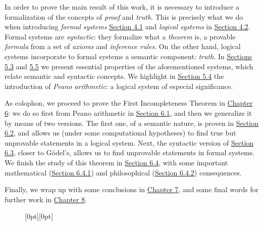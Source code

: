 In order to prove the main result of this work, it is necessary to introduce a formalization of the concepts of \emph{proof} and \emph{truth}. This is precisely what we do when introducing \emph{formal systems} \hyperref[sec:sistemas-formales]{Section 4.1} and \emph{logical systems} in \hyperref[sec:sistemas-logicos]{Section 4.2}. Formal systems are \emph{syntactic}: they formalize what a \emph{theorem} is, a provable \emph{formula} from a set of \emph{axioms} and \emph{inference rules}. On the other hand, logical systems incorporate to formal systems a semantic component: \emph{truth}. In \hyperref[sec:solidez-completitud-decidibilidad]{Sections 5.3} and \hyperref[sec:consistencia]{5.5} we present essential properties of the aforementioned systems, which relate semantic and syntactic concepts. We highlight in \hyperref[sec:aritmetica-peano]{Section 5.4} the introduction of \emph{Peano arithmetic}: a logical system of especial significance.

As colophon, we proceed to prove the First Incompleteness Theorem in \hyperref[ch:teorema-incompletitud]{Chapter 6}: we do so first from Peano arithmetic in \hyperref[sec:primera-aproximacion]{Section 6.1}, and then we generalize it by means of two versions. The first one, of a semantic nature, is proven in \hyperref[sec:version-semantica]{Section 6.2}, and allows us (under some computational hypotheses) to find true but unprovable statements in a logical system. Next, the syntactic version of \hyperref[sec:version-sintactica]{Section 6.3}, closer to Gödel's, allows us to find unprovable statements in formal systems. We finish the study of this theorem in \hyperref[sec:consecuencias]{Section 6.4}, with some important mathematical (\hyperref[subsec:segundo-problema-hilbert]{Section 6.4.1}) and philosophical (\hyperref[subsec:mente-humana-tesis-church-turing]{Section 6.4.2}) consequences.

Finally, we wrap up with some conclusions in \hyperref[ch:conclusiones]{Chapter 7}, and some final words for further work in \hyperref[ch:trabajo-futuro]{Chapter 8}.

%

\begin{landscape}
\begin{figure}[H]

\centering
\raisebox{-15.5cm}[0pt][0pt]{%
\resizebox{\linewidth}{!}{}
}
\end{figure}
\end{landscape}

\endinput

